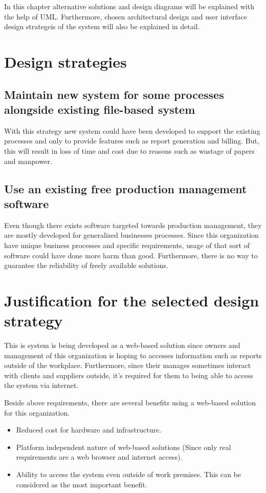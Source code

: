 \documentclass[12pt]{report}
\begin{document}
In this chapter alternative solutions and design diagrams will be explained with the help of UML. Furthermore, chosen architectural design and user interface design strategeis of the system will also be explained in detail.

\section{Design strategies}

\subsection{Maintain new system for some processes alongside existing file-based system}
With this strategy new system could have been developed to support the existing processes and only to provide features such as report generation and billing. But, this will result in loss of time and cost due to reasons such as wastage of papers and manpower.

\subsection{Use an existing free production management software}
Even though there exists software targeted towards production management, they are mostly developed for generalized businesses processes. Since this organization have unique business processes and specific requirements, usage of that sort of software could have done more harm than good. Furthermore, there is no way to guarantee the reliability of freely available solutions.

\section{Justification for the selected design strategy}
This is system is being developed as a web-based solution since owners and management of this organization is hoping to accesses information such as reports outside of the workplace. Furthermore, since their manages sometimes interact with clients and suppliers outside, it’s required for them to being able to access the system via internet.

Beside above requirements, there are several benefits using a web-based solution for this organization.

\begin{itemize}
	\item Reduced cost for hardware and infrastructure.

	\item Platform independent nature of web-based solutions (Since only real requirements are a web browser and internet access).

	\item Ability to access the system even outside of work premises. This can be considered as the most important benefit.
\end{itemize}
\end{document}
